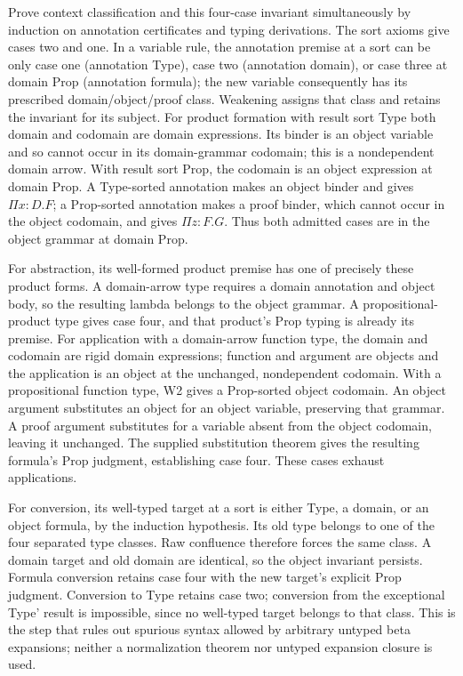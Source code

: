 Prove context classification and this four-case invariant simultaneously
by induction on annotation certificates and typing derivations. The sort
axioms give cases two and one. In a variable rule, the annotation premise
at a sort can be only case one (annotation Type), case two (annotation
domain), or case three at domain Prop (annotation formula); the new
variable consequently has its prescribed domain/object/proof class.
Weakening assigns that class and retains the invariant for its subject.
For product formation with result sort Type both domain and codomain
are domain expressions. Its binder is an object variable and so cannot
occur in its domain-grammar codomain; this is a nondependent domain arrow.
With result sort Prop, the codomain is an object expression at domain
Prop. A Type-sorted annotation makes an object binder and gives
\(\Pi x:D.F\); a Prop-sorted annotation makes a proof binder, which
cannot occur in the object codomain, and gives \(\Pi z:F.G\).
Thus both admitted cases are in the object grammar at domain Prop.

For abstraction, its well-formed product premise has one of precisely
these product forms. A domain-arrow type requires a domain annotation
and object body, so the resulting lambda belongs to the object grammar.
A propositional-product type gives case four, and that product's
Prop typing is already its premise. For application with a domain-arrow
function type, the domain and codomain are rigid domain expressions;
function and argument are objects and the application is an object at
the unchanged, nondependent codomain. With a propositional function type,
W2 gives a Prop-sorted object codomain. An object argument substitutes an
object for an object variable, preserving that grammar. A proof argument
substitutes for a variable absent from the object codomain, leaving it
unchanged. The supplied substitution theorem gives the resulting formula's
Prop judgment, establishing case four. These cases exhaust applications.

For conversion, its well-typed target at a sort is either Type, a domain,
or an object formula, by the induction hypothesis. Its old type belongs
to one of the four separated type classes. Raw confluence therefore
forces the same class. A domain target and old domain are identical,
so the object invariant persists. Formula conversion retains case four
with the new target's explicit Prop judgment. Conversion to Type retains
case two; conversion from the exceptional Type' result is impossible,
since no well-typed target belongs to that class. This is the step that
rules out spurious syntax allowed by arbitrary untyped beta expansions;
neither a normalization theorem nor untyped expansion closure is used.

